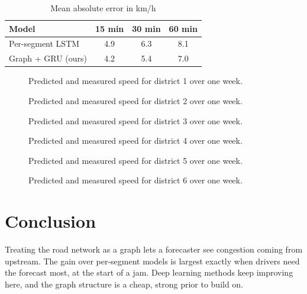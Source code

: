\documentclass[conference]{IEEEtran}
\begin{document}
\begin{table}[t]
\caption{Mean absolute error in km/h\label{t3}}
\centering
\begin{tabular}{lccc}
\hline
Model & 15 min & 30 min & 60 min \\
\hline
Per-segment LSTM & 4.9 & 6.3 & 8.1 \\
Graph + GRU (ours) & 4.2 & 5.4 & 7.0 \\
\hline
\end{tabular}
\end{table}
\begin{figure}[p]\centering{}
\caption{Predicted and measured speed for district 1 over one week.}\end{figure}
\begin{figure}[p]\centering{}
\caption{Predicted and measured speed for district 2 over one week.}\end{figure}
\begin{figure}[p]\centering{}
\caption{Predicted and measured speed for district 3 over one week.}\end{figure}
\begin{figure}[p]\centering{}
\caption{Predicted and measured speed for district 4 over one week.}\end{figure}
\begin{figure}[p]\centering{}
\caption{Predicted and measured speed for district 5 over one week.}\end{figure}
\begin{figure}[p]\centering{}
\caption{Predicted and measured speed for district 6 over one week.}\end{figure}

\clearpage
\section{Conclusion}
Treating the road network as a graph lets a forecaster see congestion coming from upstream. The gain over per-segment
models is largest exactly when drivers need the forecast most, at the start of a jam. Deep learning methods
\cite{lecun} keep improving here, and the graph structure is a cheap, strong prior to build on.
\end{document}
